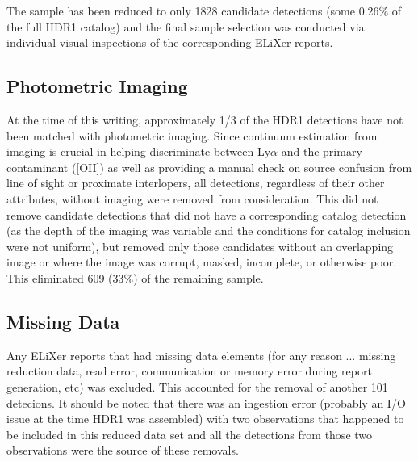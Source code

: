 \documentclass{aastex62}
\begin{document}
The sample has been reduced to only 1828 candidate detections (some 0.26\% of the full HDR1 catalog) and the final sample selection was conducted via individual visual inspections of the corresponding ELiXer reports.

\subsection{Photometric Imaging}
At the time of this writing, approximately 1/3 of the HDR1 detections have not been matched with photometric imaging. Since continuum estimation from imaging is crucial in helping discriminate between Ly$\alpha$ and the primary contaminant ([OII]) as well as providing a manual check on source confusion from line of sight or proximate interlopers, all detections, regardless of their other attributes, without imaging were removed from consideration. This did not remove candidate detections that did not have a corresponding catalog detection (as the depth of the imaging was variable and the conditions for catalog inclusion were not uniform), but removed only those candidates without an overlapping image or where the image was corrupt, masked, incomplete, or otherwise poor. This eliminated 609 (33\%) of the remaining sample.

 \subsection{Missing Data}
 Any ELiXer reports that had missing data elements (for any reason ... missing reduction data, read error, communication or memory error during report generation, etc) was excluded. This accounted for the removal of another 101 detecions. It should be noted that there was an ingestion error (probably an I/O issue at the time HDR1 was assembled) with two observations that happened to be included in this reduced data set and all the detections from those two observations were the source of these removals. 
 
\end{document}
